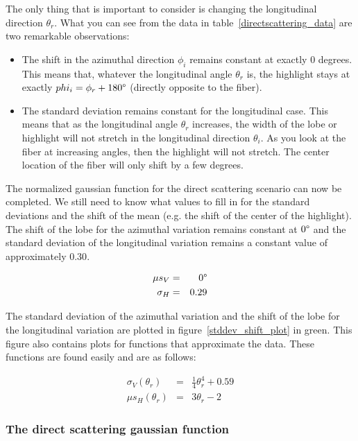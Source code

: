 \documentclass[11pt,a4paper]{report}
\begin{document}
The only thing that is important to consider is changing the longitudinal direction $\theta_r$. What you can see from the data in table~\ref{directscattering_data} are two remarkable observations:

\begin{itemize}
\item The shift in the azimuthal direction $\phi_i$ remains constant at exactly 0 degrees. This means that, whatever the longitudinal angle $\theta_r$ is, the highlight stays at exactly $phi_i = \phi_r + 180\degree$ (directly opposite to the fiber).

\item The standard deviation remains constant for the longitudinal case. This means that as the longitudinal angle $\theta_r$ increases, the width of the lobe or highlight will not stretch in the longitudinal direction $\theta_i$. As you look at the fiber at increasing angles, then the highlight will not stretch. The center location of the fiber will only shift by a few degrees. 
\end{itemize}

The normalized gaussian function for the direct scattering scenario can now be completed. We still need to know what values to fill in for the standard deviations and the shift of the mean (e.g. the shift of the center of the highlight). The shift of the lobe for the azimuthal variation remains constant at $0\degree$ and the standard deviation of the longitudinal variation remains a constant value of approximately $0.30$.

\begin{eqnarray}
\mu s_V & = & 0\degree \\
\sigma_H & = & 0.29
\end{eqnarray}

The standard deviation of the azimuthal variation and the shift of the lobe for the longitudinal variation are plotted in figure~\ref{stddev_shift_plot} in green. This figure also contains plots for functions that approximate the data. These functions are found easily and are as follows:

\begin{eqnarray}
\sigma_V(\theta_r) & = & \frac{1}{4} \theta_r^4 + 0.59 \\
\mu s_H(\theta_r) & = & 3\theta_r - 2
\end{eqnarray}


\subsubsection{The direct scattering gaussian function}
\end{document}
